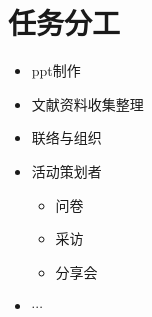 \documentclass{ctexart}
\begin{document}
\section{任务分工}
\begin{itemize}
    \item ppt制作
    \item 文献资料收集整理
    \item 联络与组织
    \item 活动策划者
    \begin{itemize}
        \item 问卷
        \item 采访
        \item 分享会
    \end{itemize}
    \item $\cdots$
\end{itemize}
\end{document}

